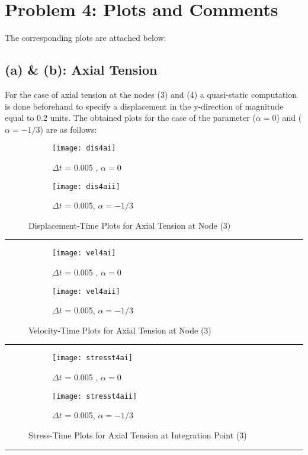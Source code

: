 \section*{Problem 4: Plots and Comments}
The corresponding plots are attached below: 
\subsection*{(a) \& (b): Axial Tension }
For the case of axial tension at the nodes (3) and (4) a quasi-static computation is done beforehand to specify a displacement in the y-direction of magnitude equal to 0.2 units. The obtained plots for the case of the parameter ($\alpha = 0$) and ($\alpha = -1/3$) are as follows: 
\begin{figure}[h!]
\centering
\begin{subfigure}{.5\textwidth}
  \centering
  \texttt{[image: dis4ai]}
  \caption{$\Delta t$ = 0.005 , $\alpha = 0$}
  \label{fig:sub1}
\end{subfigure}%
\begin{subfigure}{.5\textwidth}
  \centering
  \texttt{[image: dis4aii]}
  \caption{$\Delta t$ = 0.005, $\alpha = -1/3$}
  \label{fig:sub2}
\end{subfigure}
\caption{ Displacement-Time Plots for Axial Tension at Node (3) }
\label{Disp-Axial-Tension}
\end{figure}\hrule
\begin{figure}[htbp]
\centering
\begin{subfigure}{.5\textwidth}
  \centering
  \texttt{[image: vel4ai]}
  \caption{$\Delta t$ = 0.005 , $\alpha = 0$}
  \label{fig:sub1}
\end{subfigure}%
\begin{subfigure}{.5\textwidth}
  \centering
  \texttt{[image: vel4aii]}
  \caption{$\Delta t$ = 0.005, $\alpha = -1/3$}
  \label{fig:sub2}
\end{subfigure}
\caption{ Velocity-Time Plots for Axial Tension at Node (3) }
\label{Vel-Axial-Tension}
\end{figure}\hrule
\begin{figure}[htbp]
\centering
\begin{subfigure}{.5\textwidth}
  \centering
  \texttt{[image: stresst4ai]}
  \caption{$\Delta t$ = 0.005 , $\alpha = 0$}
  \label{fig:sub1}
\end{subfigure}%
\begin{subfigure}{.5\textwidth}
  \centering
  \texttt{[image: stresst4aii]}
  \caption{$\Delta t$ = 0.005, $\alpha = -1/3$}
  \label{fig:sub2}
\end{subfigure}
\caption{ Stress-Time Plots for Axial Tension at Integration Point (3) }
\label{Sigma-Axial-Tension}
\end{figure}\hrule
